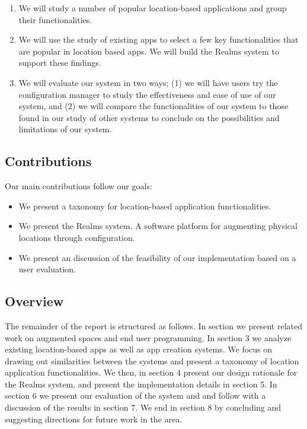 \begin{enumerate}
	\item  We will study a number of popular location-based applications and group their functionalities. 
	\item We will use the study of existing apps to select a few key functionalities that are popular in location based apps. We will build the Realms system to support these findings.
	\item We will evaluate our system in two ways; (1) we will have users try the configuration manager to study the effectiveness and ease of use of our system, and (2) we will compare the functionalities of our system to those found in our study of other systems to conclude on the possibilities and limitations of our system.
\end{enumerate}

\subsection{Contributions} %
\label{sub:contributions}
Our main contributions follow our goals:

\begin{itemize}
	\item We present a taxonomy for location-based application functionalities. 
	\item We present the Realms system. A software platform for augmenting physical locations through configuration.
	\item We present an discussion of the feasibility of our implementation based on a user evaluation.
\end{itemize}

\subsection{Overview} %
\label{sub:overview}
The remainder of the report is structured as follows. In section we present related work on augmented spaces and end user programming. In section 3 we analyze existing location-based apps as well as app creation systems. We focus on drawing out similarities between the systems and present a taxonomy of location application functionalities. We then, in section 4 present our design rationale for the Realms system, and present the implementation details in section 5. In section 6 we present our evaluation of the system and and follow with a discussion of the results in section 7. We end in section 8 by concluding and suggesting directions for future work in the area.
